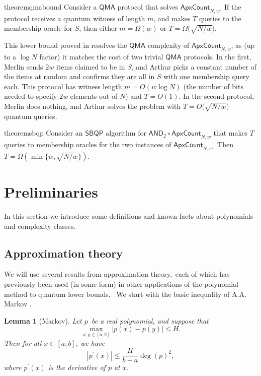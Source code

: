 \documentclass[10pt,a4paper]{article}
\newtheorem{lemma}[theorem]{Lemma}
\newcommand{\<}{\langle}
\renewcommand{\>}{\rangle}
\newcommand{\ApxCount}{\mathsf{ApxCount}_{N,w}}
\newcommand{\AndApxCount}{\mathsf{AND}_2\circ\mathsf{ApxCount}_{N,w}}
\begin{document}
\begin{restatable}{theorem}{qmabound}
\label{thm:qmabound}
Consider a $\mathsf{QMA}$ protocol that solves $\ApxCount$. If the protocol receives a quantum witness of length $m$, and makes $T$ queries to the membership oracle for $S$, then
either $m = \Omega(w)$ or 
$ T = \Omega\bigl(\sqrt{N/w}\bigr)$.
\end{restatable}

This lower bound proved in  resolves the $\mathsf{QMA}$ complexity of  $\ApxCount$, as (up to a $\log N$ factor) it matches the cost of two trivial $\mathsf{QMA}$ protocols.
In the first, Merlin sends $2w$ items claimed to be in $S$,
and Arthur picks a constant number of the items at random
and confirms they are all in $S$ with one membership query each. 
This protocol has witness length $m=O(w\log N)$ (the number of bits needed to specify $2w$ elements out of $N$) and $T=O(1)$. 
In the second protocol, Merlin does nothing, and Arthur solves the problem with $T=O\bigl(\sqrt{N/w}\bigr)$ quantum queries.

\begin{restatable}{theorem}{sbqp}
\label{thm:sbqp}
Consider an $\mathsf{SBQP}$ algorithm for $\AndApxCount$ that makes $T$ queries to membership oracles for the two instances of $\ApxCount$. Then $T=\Omega\left(\min\bigl\{w,\sqrt{N/w}\bigr\}\right)$.
\end{restatable}

\setcounter{section}{1}
\setcounter{theorem}{5}
\setcounter{equation}{4}
\setcounter{figure}{2}
\section{Preliminaries}

\label{sec:prelim}

In this section we introduce some definitions and known facts about
polynomials and complexity classes.

%
\subsection{Approximation theory}
\label{s:approxprelim}
We will use several results from approximation theory,\ each of which has
previously been used (in some form) in other applications of the polynomial
method to quantum lower bounds. \ We start with the basic inequality of A.A.
Markov \cite{markov1890question}.

\begin{lemma}[Markov]
\label{markovlem}Let $p$\ be a real polynomial, and suppose that
\begin{equation}
\max_{x,y\in\left[ a,b\right] }\left\vert p\left( x\right) -p\left( y\right)
\right\vert \leq H.
\end{equation}
Then for all $x\in\left[ a,b\right] $, we have
\begin{equation}
\left\vert p^{\prime}\left( x\right) \right\vert \leq\frac{H}{b-a}\deg\left(
p\right) ^{2},
\end{equation}
where $p^{\prime}(x)$ is the derivative of $p$ at $x$.
\end{lemma}
\end{document}
